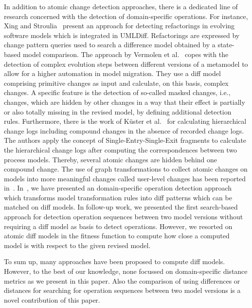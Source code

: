 In addition to atomic change detection approaches, there is a dedicated line of research concerned with the detection of domain-specific operations. For instance, Xing and Stroulia~\cite{} present an approach for detecting refactorings in evolving software models which is integrated in UMLDiff. Refactorings
are expressed by change pattern queries used to search a
difference model obtained by a state-based model comparison.
The approach by Vermolen et al.~\cite{} copes with the detection
of complex evolution steps between different versions of a
metamodel to allow for a higher automation in model
migration. They use a diff model comprising primitive changes
as input and calculate, on this basis, complex changes. A specific feature is the detection of so-called
masked changes, i.e., changes, which are hidden by other
changes in a way that their effect is partially or also totally
missing in the revised model, by defining additional detection
rules. Furthermore, there is the work of Küster et al.~\cite{} for
calculating hierarchical change logs including compound
changes in the absence of recorded change logs. The authors
apply the concept of Single-Entry-Single-Exit fragments to
calculate the hierarchical change logs after computing the
correspondences between two process models. Thereby,
several atomic changes are hidden behind one compound
change. The use of graph transformations to collect atomic
changes on models into more meaningful changes called user-level
changes has been reported in~\cite{}. In~\cite{}, we have presented an domain-specific operation detection approach which transforms model transformation rules into diff patterns which can be matched on diff models. In follow-up work, we presented the first search-based approach for detection operation sequences between two model versions without requiring a diff model as basis to detect operations. However, we resorted on atomic diff models in the fitness function to compute how close a computed model is with respect to the given revised model.

To sum up, many approaches have been proposed to compute diff models. However, to the best of our knowledge, none focussed on domain-specific distance metrics as we present in this paper. Also the comparison of using differences or distances for searching for operation sequences between two model versions is a novel contribution of this paper.

